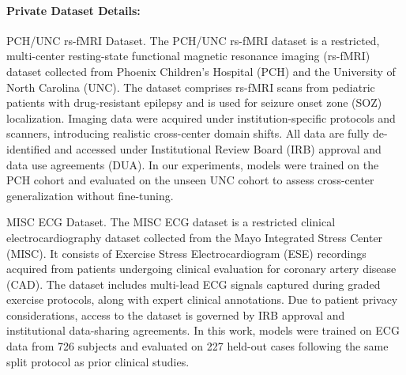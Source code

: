 \documentclass{article}
\begin{document}
\paragraph{Private Dataset Details:}
PCH/UNC rs-fMRI Dataset.
The PCH/UNC rs-fMRI dataset is a restricted, multi-center resting-state functional magnetic resonance imaging (rs-fMRI) dataset collected from Phoenix Children’s Hospital (PCH) and the University of North Carolina (UNC). The dataset comprises rs-fMRI scans from pediatric patients with drug-resistant epilepsy and is used for seizure onset zone (SOZ) localization. Imaging data were acquired under institution-specific protocols and scanners, introducing realistic cross-center domain shifts. All data are fully de-identified and accessed under Institutional Review Board (IRB) approval and data use agreements (DUA). In our experiments, models were trained on the PCH cohort and evaluated on the unseen UNC cohort to assess cross-center generalization without fine-tuning.

MISC ECG Dataset.
The MISC ECG dataset is a restricted clinical electrocardiography dataset collected from the Mayo Integrated Stress Center (MISC). It consists of Exercise Stress Electrocardiogram (ESE) recordings acquired from patients undergoing clinical evaluation for coronary artery disease (CAD). The dataset includes multi-lead ECG signals captured during graded exercise protocols, along with expert clinical annotations. Due to patient privacy considerations, access to the dataset is governed by IRB approval and institutional data-sharing agreements. In this work, models were trained on ECG data from 726 subjects and evaluated on 227 held-out cases following the same split protocol as prior clinical studies.
\end{document}
